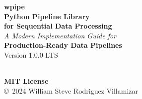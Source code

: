 \documentclass[12pt,a4paper]{report}
\begin{document}
\begin{titlepage}
    \centering
    \vspace*{2cm}

    \ifdefined{}
    \centering
    \fi

    \vspace{1.5cm}

    {\color{blue!70!black}\Huge\textbf{\sffamily wpipe}}\\[0.3cm]
    {\color{blue!70!black}\LARGE\textbf{\sffamily Python Pipeline Library}}\\[1cm]

    {\color{orange!80!black}\Large\textbf{\sffamily for Sequential Data Processing}}\\[1.5cm]

    {\large\textit{\sffamily A Modern Implementation Guide for}}\\[0.3cm]
    {\Large\textbf{\sffamily Production-Ready Data Pipelines}}\\[2cm]

    {\large\sffamily Version 1.0.0 LTS}\\[0.5cm]
    {\large\sffamily\the\year}\\[2cm]


    \vspace{2cm}
    \vfill
    {\large\sffamily\textbf{MIT License}}\\
    {\small\sffamily\copyright\ 2024 William Steve Rodriguez Villamizar}
\end{titlepage}
\end{document}
